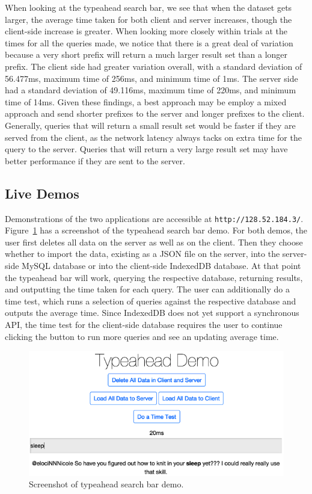 \documentclass{vldb}
\begin{document}
When looking at the typeahead search bar, we see that when the dataset gets larger, the average time taken for both client and server increases, though the client-side increase is greater. When looking more closely within trials at the times for all the queries made, we notice that there is a great deal of variation because a very short prefix will return a much larger result set than a longer prefix. The client side had greater variation overall, with a standard deviation of 56.477ms, maximum time of 256ms, and minimum time of 1ms. The server side had a standard deviation of 49.116ms, maximum time of 220ms, and minimum time of 14ms. Given these findings, a best approach may be employ a mixed approach and send shorter prefixes to the server and longer prefixes to the client. Generally, queries that will return a small result set would be faster if they are served from the client, as the network latency always tacks on extra time for the query to the server. Queries that will return a very large result set may have better performance if they are sent to the server.



\subsection{Live Demos}

Demonstrations of the two applications are accessible at \texttt{http://128.52.184.3/}. Figure~\ref{demo} has a screenshot of the typeahead search bar demo. For both demos, the user first deletes all data on the server as well as on the client. Then they choose whether to import the data, existing as a JSON file on the server, into the server-side MySQL database or into the client-side IndexedDB database. At that point the typeahead bar will work, querying the respective database, returning results, and outputting the time taken for each query. The user can additionally do a time test, which runs a selection of queries against the respective database and outputs the average time. Since IndexedDB does not yet support a synchronous API, the time test for the client-side database requires the user to continue clicking the button to run more queries and see an updating average time.


\begin{figure}[h!]
\centering
   \includegraphics[scale=.34]{typeahead}
  \caption{Screenshot of typeahead search bar demo.}
\label{demo}
\end{figure}
\end{document}

